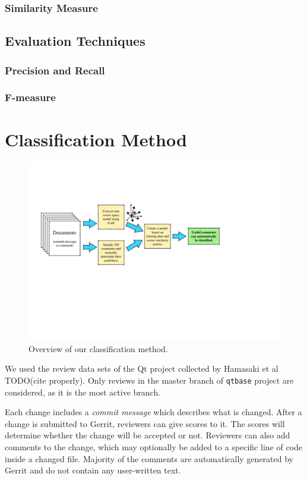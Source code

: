 \documentclass[conference]{IEEEtran}
\begin{document}
\subsubsection{Similarity Measure}
\subsection{Evaluation Techniques}
\subsubsection{Precision and Recall}
\subsubsection{F-measure}


\section{Classification Method}

\begin{figure}
\centering
\includegraphics[width=6in]{overview}
\caption{Overview of our classification method.}
\label{fig:overview}
\end{figure}

We used the review data sets of the Qt project collected by Hamasaki et al TODO(cite properly).
Only reviews in the master branch of \texttt{qtbase} project are considered,
as it is the most active branch.

Each change includes a \emph{commit message} which describes what is changed.
After a change is submitted to Gerrit, reviewers can give scores to it.
The scores will determine whether the change will be accepted or not.
Reviewers can also add comments to the change, which may optionally be added to a specific line of code inside a changed file.
Majority of the comments are automatically generated by Gerrit and do not contain any user-written text.
\end{document}
